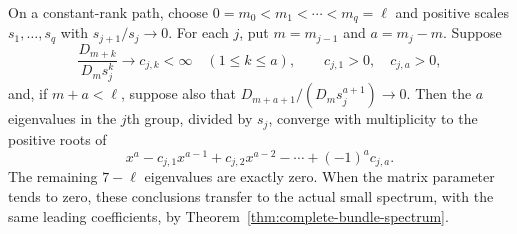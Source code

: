 \begin{proposition}\label{prop:coefficient-hierarchy}
On a constant-rank path, choose
$0=m_0<m_1<\cdots<m_q=\ell$ and positive scales
$s_1,\ldots,s_q$ with $s_{j+1}/s_j\to0$.
For each $j$, put $m=m_{j-1}$ and $a=m_j-m$.
Suppose
\begin{equation}\label{eq:coefficient-limits}
 \frac{D_{m+k}}{D_ms_j^k}\longrightarrow c_{j,k}<\infty
 \quad(1\le k\le a),\qquad c_{j,1}>0,\quad c_{j,a}>0,
\end{equation}
and, if $m+a<\ell$, suppose also that
$D_{m+a+1}/(D_ms_j^{a+1})\to0$.
Then the $a$ eigenvalues in the $j$th group, divided by
$s_j$, converge with multiplicity to the positive roots of
\begin{equation}\label{eq:group-polynomial}
 x^a-c_{j,1}x^{a-1}+c_{j,2}x^{a-2}
                      -\cdots+(-1)^ac_{j,a}.
\end{equation}
The remaining $7-\ell$ eigenvalues are exactly zero.
When the matrix parameter tends to zero, these conclusions
transfer to the actual small spectrum, with the same
leading coefficients, by Theorem~\ref{thm:complete-bundle-spectrum}.
\end{proposition}


